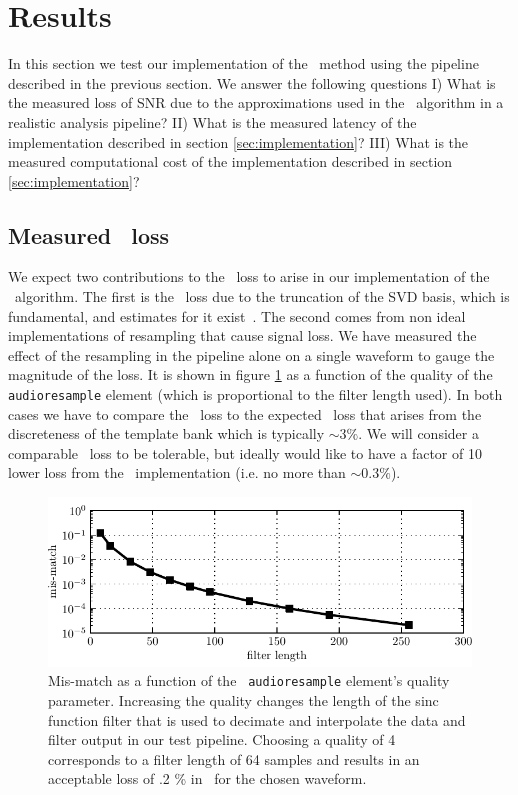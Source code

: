 \section{Results}
\label{SECIV}\label{sec:results}

In this section we test our implementation of the \lloid\ method using the
pipeline described in the previous section.  We answer the following questions
%
I) What is the measured loss of SNR due to the approximations used in the
\lloid\ algorithm in a realistic analysis pipeline?
%
II) What is the measured latency of the implementation described in section
\ref{sec:implementation}?
%
III) What is the measured computational cost of the implementation described in
section \ref{sec:implementation}?

\subsection{Measured \SNR\ loss}

We expect two contributions to the \SNR\ loss to arise in our implementation of
the \lloid\ algorithm.  The first is the \SNR\ loss due to the truncation of
the SVD basis, which is fundamental, and estimates for it
exist~\cite{Cannon:2010p10398}.  The second comes from non ideal
implementations of resampling that cause signal loss.  We have measured the
effect of the resampling in the pipeline alone on a single waveform to gauge
the magnitude of the loss.  It is shown in figure \ref{fig:resamp_mm} as a
function of the quality of the {\tt audioresample} element (which is
proportional to the filter length used).  In both cases we have to compare the
\SNR\ loss to the expected \SNR\ loss that arises from the discreteness of the
template bank which is typically $\sim 3\%$.  We will consider a comparable
\SNR\ loss to be tolerable, but ideally would like to have a factor of 10 lower
loss from the \lloid\ implementation (i.e. no more than $\sim 0.3 \%$).  
%
\begin{figure}
\includegraphics{resamp_mm.pdf}
\caption{\label{fig:resamp_mm}Mis-match as a function of the {\tt
audioresample} element's quality parameter.  Increasing the quality changes the
length of the sinc function filter that is used to decimate and interpolate the
data and filter output in our test pipeline.  Choosing a quality of 4
corresponds to a filter length of 64 samples and results in an acceptable loss
of .2 \% in \SNR\ for the chosen waveform.}
\end{figure}

